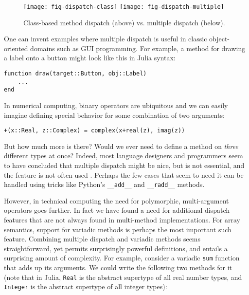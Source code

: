 \documentclass[preprint]{sigplanconf}
\newcommand{\code}[1]{\texttt{#1}}
\begin{document}
\begin{figure}
  \centering
  \texttt{[image: fig-dispatch-class]}
  \texttt{[image: fig-dispatch-multiple]}
  \caption{\label{fig:dispatch}Class-based method dispatch (above) vs. multiple dispatch (below).}
\end{figure}

One can invent examples where multiple dispatch is useful in classic
object-oriented domains such as GUI programming.
For example, a method for drawing a label onto a button might
look like this in Julia syntax:

\begin{minipage}{\linewidth}
\begin{verbatim}
function draw(target::Button, obj::Label)
    ...
end

\end{verbatim}
\end{minipage}

In numerical computing, binary operators are ubiquitous and we can easily imagine
defining special behavior for some combination of two arguments:

\begin{verbatim}
+(x::Real, z::Complex) = complex(x+real(z), imag(z))
\end{verbatim}

But how much more is there? Would we ever need to define a method on
\emph{three} different types at once? Indeed, most language designers and
programmers seem to have concluded that multiple dispatch might be nice, but is
not essential, and the feature is not often used \cite{Muschevici:2008}.
Perhaps the few cases that seem to need it can be handled using tricks like
Python's \code{\_\_add\_\_} and \code{\_\_radd\_\_} methods.

However, in technical computing the need for polymorphic, multi-argument
operators goes further. In fact we have found a need for additional
dispatch features that are not always found in multi-method implementations.
For array semantics, support for variadic methods is perhaps the most
important such feature. Combining multiple dispatch and variadic methods
seems straightforward, yet permits surprisingly powerful definitions, and
entails a surprising amount of complexity. For example,
consider a variadic \code{sum} function that adds up its arguments. We could
write the following two methods for it (note that in Julia, \code{Real} is
the abstract supertype of all real number types, and \code{Integer} is the
abstract supertype of all integer types):
\end{document}
